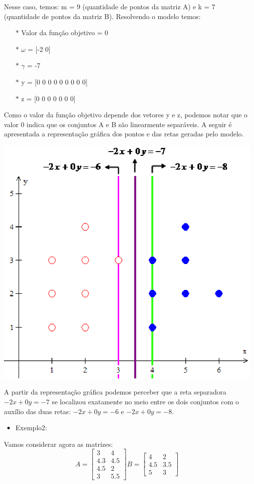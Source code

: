 Nesse caso, temos: m = 9 (quantidade de pontos da matriz A) e k = 7 (quantidade de pontos da matriz B).  Resolvendo o modelo temos:
\begin{itemize}
\item[$\ast$] Valor da função objetivo = 0
\item[$\ast$] $\omega$ = [-2  0]
\item[$\ast$] $\gamma$ = -7
\item[$\ast$] y = [0 0 0 0 0 0 0 0 0]
\item[$\ast$] z = [0 0 0 0 0 0 0]
\end{itemize}
Como o valor da função objetivo depende dos vetores y e z, podemos notar que o valor 0 indica que os conjuntos A e B são linearmente separáveis. A seguir é apresentada a representação gráfica dos pontos e das retas geradas pelo modelo.

\begin{center}
	\includegraphics[scale=0.5]{graficos/exemplo2}
	\label{img:ex1}
\end{center}

A partir da representação gráfica podemos perceber que a reta separadora $-2x + 0y = -7$ se localizou exatamente no meio entre os dois conjuntos com o auxílio das duas retas: $-2x + 0y = -6$ e $-2x + 0y = -8$.

\begin{itemize}
\item Exemplo2:
\end{itemize}
Vamos  considerar agora as matrizes:
$$A=\begin{bmatrix}3 & 4\\ 4.3 & 4.5\\ 4.5 & 2\\ 3 & 5.5\end{bmatrix}
B=\begin{bmatrix}4 & 2\\ 4.5 & 3.5\\ 5 & 3\end{bmatrix}$$

